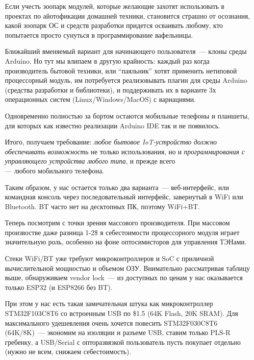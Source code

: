 \clearpage

Если учесть зоопарк модулей, которые желающие захотят использовать в проектах по
айотофикации домашней техники, становится страшно
от осознания, какой зоопарк ОС и средств разработки придется осваивать любому,
кто попытается просто сунуться в программирование вафельницы.

Ближайший вменяемый вариант для начинающего пользователя\ --- клоны среды
Arduino. Но тут мы влипаем в другую крайность: каждый раз когда производитель
бытовой техники, или ``паяльник'' хотят применить нетиповой процессорный модуль,
им потребуется реализовывать плагин для среды Arduino (средства разработки и
библиотеки), и поддерживать их в варианте 3х операционных систем
(Linux/Windows/MacOS) с вариациями.

Одновременно полностью за бортом остаются мобильные телефоны и планшеты, для
которых как известно реализации Arduino IDE так и не появилось.

\begin{framed}\noindent
Итого, получаем требование: \emph{любое бытовое IoT-устройство должно
обеспечивать возможность} не только использования, но и \emph{программирования с
управляющего устройства любого типа}, и прежде всего\\ --- любого мобильного
телефона.
\end{framed}

Таким образом, у нас остается только два варианта\ --- веб-интерфейс, или
командная консоль через последовательный интерфейс, завернутый в WiFi или
Bluetooth. BT часто нет на десктопных ПК, поэтому WiFi+BT.

\clearpage
Теперь посмотрим с точки зрения массового производителя. При массовом
произвостве даже разница 1-2\$ в себестоимости процессорного модуля играет
значительную роль, особенно на фоне оптосимисторов для управления ТЭНами.

Стеки WiFi/BT уже требуют микроконтроллеров и SoC с приличной вычислительной
мощностью и объемом ОЗУ. Внимательно рассматривая таблицу выше, обнаруживаем
vendor lock\ --- из доступных по ценам у нас оказывается только ESP32 (и ESP8266
без BT).

При этом у нас есть такая замечательная штука как микроконтроллер STM32F103C8T6
со встроенным USB по \$1.5 (64K Flash, 20K SRAM). Для максимального удешевления
очень хочется повесить STM32F030C8T6 (64K/8K)\ ---
экономим на изоляции и разъеме USB, ставим только PLS-R гребенку, а USB/Serial с
опторазвязкой пользователь пусть покупает отдельно (нужно не всем, снижаем
себестоимость).

